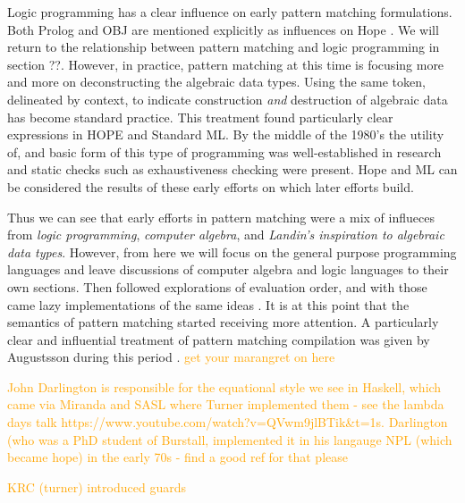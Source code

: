 \documentclass[acmsmall]{acmart}
\renewcommand\todo[1]{\textcolor{orange}{#1}}
\begin{document}
Logic programming has a clear influence on early pattern matching formulations.  Both Prolog and OBJ are mentioned explicitly as influences on Hope \cite{burstall_hope_1980}.  We will return to the relationship between pattern matching and logic programming in section ??.   However, in practice, pattern matching at this time is focusing more and more on  deconstructing the algebraic data types.  Using the same token, delineated by context, to indicate construction \emph{and} destruction of algebraic data has become standard practice.  This treatment found particularly clear expressions in HOPE\cite{burstall_hope_1980} and Standard ML\cite{milner_proposal_1984}.  By the middle of the 1980's the utility of, and basic form of this type of programming was well-established in research and static checks such as exhaustiveness checking were present.  Hope and ML can be considered the results of these early efforts on which later efforts build.

Thus we can see that early efforts in pattern matching were a mix of influeces from \emph{logic programming}, \emph{computer algebra}, and \emph{Landin's inspiration to algebraic data types}.  However, from here we will focus on the general purpose programming languages and leave discussions of computer algebra and logic languages to their own sections.
Then followed explorations of evaluation order, and with those came lazy implementations of the same ideas \cite{augustsson_compiler_1984}.  It is at this point that the semantics of pattern matching started receiving more attention.  A particularly clear and influential treatment of pattern matching compilation was given by Augustsson during this period \cite{augustsson_compiling_1985}. \todo{get your marangret on here}

\todo{John Darlington is responsible for the equational style we see in Haskell, which came via Miranda and SASL where Turner implemented them - see the lambda days talk https://www.youtube.com/watch?v=QVwm9jlBTik&t=1s.  Darlington (who was a PhD student of Burstall, implemented it in his langauge NPL (which became hope) in the early 70s - find a good ref for that please}

\todo{KRC (turner) introduced guards}
\end{document}
